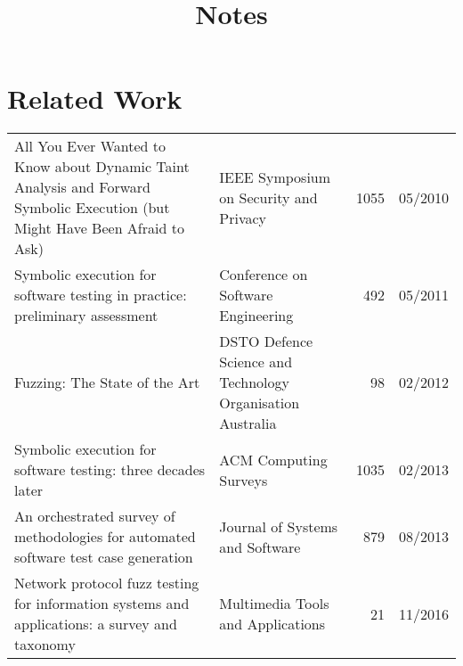 \documentclass{article}
\title{Notes}
\begin{document}


\maketitle
\tableofcontents
\pagebreak

\section{Related Work}
\begin{longtable}{|P{0.44\textwidth}|P{0.32\textwidth}|r|r|}
  \hline
                                                                                                                               &                                              &  &  \\\hline
  \endhead
  All You Ever Wanted to Know about Dynamic Taint Analysis and Forward Symbolic Execution (but Might Have Been Afraid to Ask)\cite{AllYouEverWanted} & IEEE Symposium on Security and Privacy                     & 1055           & 05/2010       \\\hline
  Symbolic execution for software testing in practice: preliminary assessment\cite{PreliminaryAssessment}                                            & Conference on Software Engineering                         & 492            & 05/2011       \\\hline
  Fuzzing: The State of the Art\cite{FuzzingTheStateOfTheArt}                                                                                        & DSTO Defence Science and Technology Organisation Australia & 98             & 02/2012       \\\hline
  Symbolic execution for software testing: three decades later\cite{ReviewThreeDecades}                                                              & ACM Computing Surveys                                      & 1035           & 02/2013       \\\hline
  An orchestrated survey of methodologies for automated software test case generation\cite{Orchestrated}                                             & Journal of Systems and Software                            & 879            & 08/2013       \\\hline
  Network protocol fuzz testing for information systems and applications: a survey and taxonomy\cite{Network}                                        & Multimedia Tools and Applications                          & 21             & 11/2016       \\\hline

\end{longtable}
\end{document}
